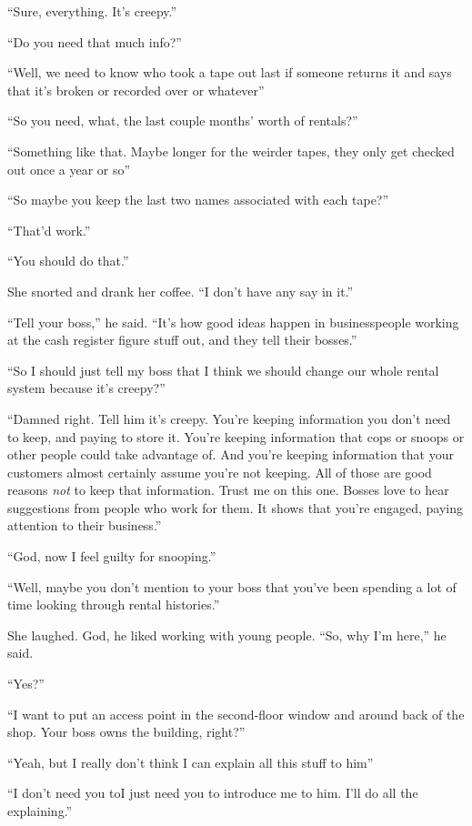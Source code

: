``Sure, everything.  It's creepy.''

``Do you need that much info?''

``Well, we need to know who took a tape out last if someone returns it
and says that it's broken or recorded over or whatever\dash{}''

``So you need, what, the last couple months' worth of rentals?''

``Something like that.  Maybe longer for the weirder tapes, they only
get checked out once a year or so\dash{}''

``So maybe you keep the last two names associated with each tape?''

``That'd work.''

``You should do that.''

She snorted and drank her coffee.  ``I don't have any say in it.''

``Tell your boss,'' he said.  ``It's how good ideas happen in
business\dash{}people working at the cash register figure stuff out, and
they tell their bosses.''

``So I should just tell my boss that I think we should change our
whole rental system because it's creepy?''

``Damned right.  Tell him it's creepy.  You're keeping information you
don't need to keep, and paying to store it.  You're keeping
information that cops or snoops or other people could take advantage
of.  And you're keeping information that your customers almost
certainly assume you're not keeping.  All of those are good reasons
\textit{not} to keep that information.  Trust me on this one.  Bosses
love to hear suggestions from people who work for them.  It shows that
you're engaged, paying attention to their business.''

``God, now I feel guilty for snooping.''

``Well, maybe you don't mention to your boss that you've been spending
a lot of time looking through rental histories.''

She laughed.  God, he liked working with young people.  ``So, why I'm
here,'' he said.

``Yes?''

``I want to put an access point in the second-floor window and around
back of the shop.  Your boss owns the building, right?''

``Yeah, but I really don't think I can explain all this stuff to
him\dash{}''

``I don't need you to\dash{}I just need you to introduce me to him.  I'll
do all the explaining.''

